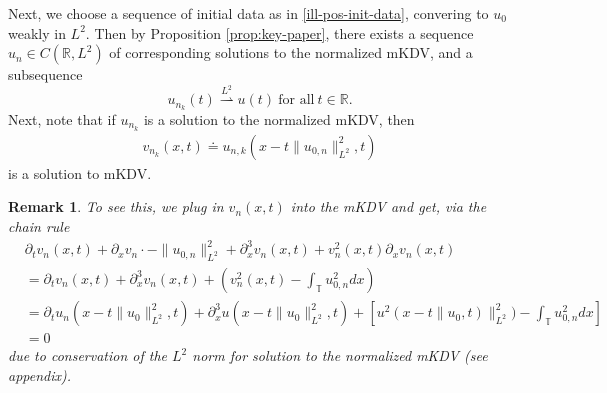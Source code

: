 \documentclass[12pt,reqno]{amsart}
\numberwithin{equation}{section}  %
\newcommand{\rr}{\mathbb{R}}
\newcommand{\ci}{\mathbb{T}}
\newcommand{\p}{\partial}
\newtheorem{remark}[theorem]{Remark}
\begin{document}
%
%
%
%
%
%
%
%
%
%
Next, we choose a sequence of initial data as in \eqref{ill-pos-init-data},
convering to $u_{0}$ weakly in $L^{2}$.  
Then by Proposition \ref{prop:key-paper}, there exists a sequence
$u_{n} \in C(\rr, L^{2})$ of corresponding solutions to the normalized mKDV, and
a subsequence 
\begin{equation*}
  u_{n_{k}}(t) \overset{L^{2}}{\rightharpoonup} u(t) \ \text{for
all} \ t \in \rr.
\end{equation*}
Next, note that if $u_{n_{k}}$ is a solution to the
normalized mKDV, then  
%
\begin{equation}
  \label{mkdv-sol}
\begin{split}
  v_{n_{k}}(x,t) \doteq u_{n,k}\left( x - t \| u_{0,n} \|^{2}_{L^{2}}, t \right)
\end{split}
\end{equation}
%
%
is a solution to mKDV.  
\begin{framed}
  \begin{remark}
    To see this, we plug in
$v_{n}(x,t)$ into the mKDV and get, via the chain rule
%
%
\begin{equation*}
\begin{split}
  & \p_{t} v_{n}(x,t) + \p_{x} v_{n} \cdot -\| u_{0,n} \|_{L^{2}}^{2} +
  \p_{x}^{3} v_{n}(x,t) + v_{n}^{2}(x,t) \p_{x} v_{n}(x,t)
  \\
  & = \p_{t} v_{n}(x,t) + \p_{x}^{3} v_{n}(x,t) + \left( v_{n}^{2}(x,t) -
  \int_{\ci} u_{0,n}^{2} dx \right)
  \\
  & = \p_{t} u_{n}(x - t \| u_{0} \|^{2}_{L^{2}},t) + \p_{x}^{3} u(x - t \|
  u_{0} \|^{2}_{L^{2}},t) + \left[ u^{2}(x - t \| u_{0},t) \|^{2}_{L^{2}}) -
  \int_{\ci} u^{2}_{0,n} dx \right]
  \\
  & = 0
\end{split}
\end{equation*}
%
%
due to conservation of the $L^{2}$ norm for solution to the normalized mKDV (see
appendix).
\end{remark}
\end{framed}
\end{document}
